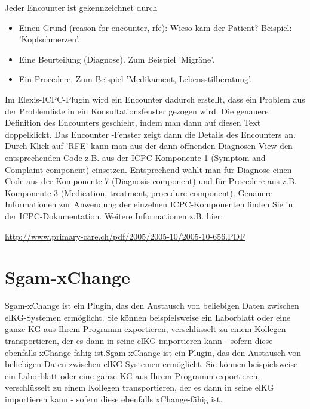 Jeder Encounter ist gekennzeichnet durch
\begin{itemize}
\item Einen Grund (reason for encounter, rfe): Wieso kam der Patient? Beispiel: 'Kopfschmerzen'.
\item Eine Beurteilung (Diagnose). Zum Beispiel 'Migräne'.
\item Ein Procedere. Zum Beispiel 'Medikament, Lebensstilberatung'.
\end{itemize}

\bigskip

Im Elexis-ICPC-Plugin wird ein Encounter dadurch erstellt, dass ein Problem aus der Problemliste in ein Konsultationsfenster gezogen wird. Die genauere Definition des Encounters geschieht, indem man dann auf diesen Text doppelklickt. Das Encounter
-Fenster zeigt dann die Details des Encounters an. Durch Klick auf 'RFE' kann man aus der dann öffnenden Diagnosen-View den entsprechenden Code z.B. aus der ICPC-Komponente 1 (Symptom and Complaint component) einsetzen. Entsprechend wählt man für Diagnose einen Code aus der Komponente 7 (Diagnosis component) und für Procedere aus z.B. Komponente 3 (Medication, treatment, procedure component).
Genauere Informationen zur Anwendung der einzelnen ICPC-Komponenten finden Sie in der ICPC-Dokumentation. Weitere Informationen z.B. hier: 

\href{http://www.primary-care.ch/pdf/2005/2005-10/2005-10-656.PDF}{http://www.primary-care.ch/pdf/2005/2005-10/2005-10-656.PDF}


\section{Sgam-xChange}
Sgam-xChange ist ein Plugin, das den Austausch von beliebigen Daten zwischen elKG-Systemen ermöglicht. Sie können beispielsweise ein Laborblatt oder eine ganze KG aus Ihrem Programm exportieren, verschlüsselt zu einem Kollegen transportieren, der es dann in seine elKG importieren kann - sofern diese ebenfalls xChange-fähig ist.Sgam-xChange ist ein Plugin, das den Austausch von beliebigen Daten zwischen elKG-Systemen ermöglicht. Sie können beispielsweise ein Laborblatt oder eine ganze KG aus Ihrem Programm exportieren, verschlüsselt zu einem Kollegen transportieren, der es dann in seine elKG importieren kann - sofern diese ebenfalls xChange-fähig ist.


